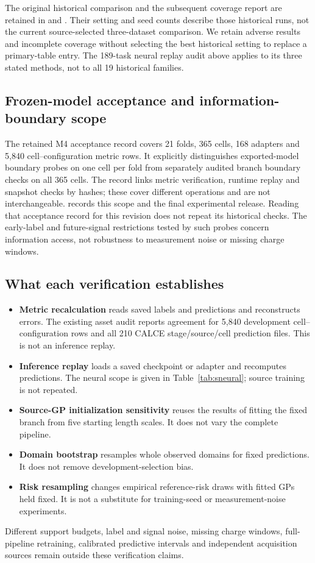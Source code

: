 \documentclass[11pt,a4paper]{article}
\begin{document}
The original historical comparison and the subsequent coverage report are retained in  and . Their setting and seed counts describe those historical runs, not the current source-selected three-dataset comparison. We retain adverse results and incomplete coverage without selecting the best historical setting to replace a primary-table entry. The 189-task neural replay audit above applies to its three stated methods, not to all 19 historical families.

\subsection{Frozen-model acceptance and information-boundary scope}
The retained M4 acceptance record covers 21 folds, 365 cells, 168 adapters and 5,840 cell--configuration metric rows. It explicitly distinguishes exported-model boundary probes on one cell per fold from separately audited branch boundary checks on all 365 cells. The record links metric verification, runtime replay and snapshot checks by hashes; these cover different operations and are not interchangeable.  records this scope and the final experimental release. Reading that acceptance record for this revision does not repeat its historical checks. The early-label and future-signal restrictions tested by such probes concern information access, not robustness to measurement noise or missing charge windows.

\subsection{What each verification establishes}
\begin{itemize}
\item \textbf{Metric recalculation} reads saved labels and predictions and reconstructs errors. The existing asset audit reports agreement for 5,840 development cell--configuration rows and all 210 CALCE stage/source/cell prediction files. This is not an inference replay.
\item \textbf{Inference replay} loads a saved checkpoint or adapter and recomputes predictions. The neural scope is given in Table~\ref{tab:sneural}; source training is not repeated.
\item \textbf{Source-GP initialization sensitivity} reuses the results of fitting the fixed branch from five starting length scales. It does not vary the complete pipeline.
\item \textbf{Domain bootstrap} resamples whole observed domains for fixed predictions. It does not remove development-selection bias.
\item \textbf{Risk resampling} changes empirical reference-risk draws with fitted GPs held fixed. It is not a substitute for training-seed or measurement-noise experiments.
\end{itemize}
Different support budgets, label and signal noise, missing charge windows, full-pipeline retraining, calibrated predictive intervals and independent acquisition sources remain outside these verification claims.
\end{document}
